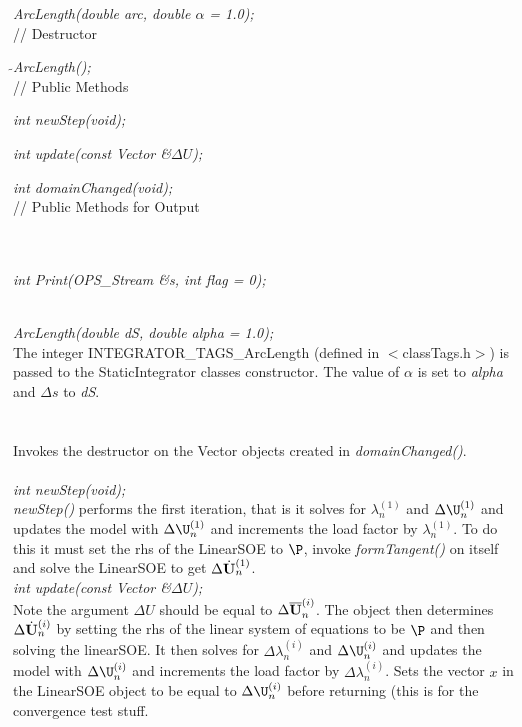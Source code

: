 {\em ArcLength(double arc, double $\alpha$ = 1.0);}\\ 

// Destructor 

{\em $\tilde{ }$ArcLength();}\\  

// Public Methods 

{\em int newStep(void);} 

{\em int update(const Vector \&$\Delta U$);} 

{\em int domainChanged(void); }\\ 

// Public Methods for Output

\\ 
\\ 
{\em int Print(OPS_Stream \&s, int flag = 0);}


 \\
{\em ArcLength(double dS, double alpha = 1.0);}\\ 

The integer INTEGRATOR\_TAGS\_ArcLength (defined in
$<$classTags.h$>$) is passed to the StaticIntegrator classes
constructor. The value of $\alpha$ is set to {\em alpha} and 
$\Delta s$ to {\em dS}. \\

 \\
\\ 
Invokes the destructor on the Vector objects created in {\em
domainChanged()}. \\

\\

{\em int newStep(void);} \\
{\em newStep()} performs the first iteration, that is it solves for 
$\lambda_n^{(1)}$ and $\Delta \U_n^{(1)}$ and updates the model with
$\Delta \U_n^{(1)}$ and increments the load factor by
$\lambda_n^{(1)}$. To do this it must set the rhs of the LinearSOE to
$\P$, invoke {\em formTangent()} on itself and solve the LinearSOE to
get $\Delta \dot{\bf U}_n^{(1)}$. \\

{\em int update(const Vector \&$\Delta U$);} \\
Note the argument $\Delta U$ should be equal to $\Delta \overline{\bf U}_n^{(i)}$.
The object then determines $\Delta \dot{\bf U}_n^{(i)}$ by setting the rhs of
the linear system of equations to be $\P$ and then solving the
linearSOE. It then solves for
$\Delta \lambda_n^{(i)}$ and $\Delta \U_n^{(i)}$ and updates the model with
$\Delta \U_n^{(i)}$ and increments the load factor by $\Delta
\lambda_n^{(i)}$. Sets the vector $x$ in the LinearSOE object to be
equal to $\Delta \U_n^{(i)}$ before returning (this is for the
convergence test stuff. \\


